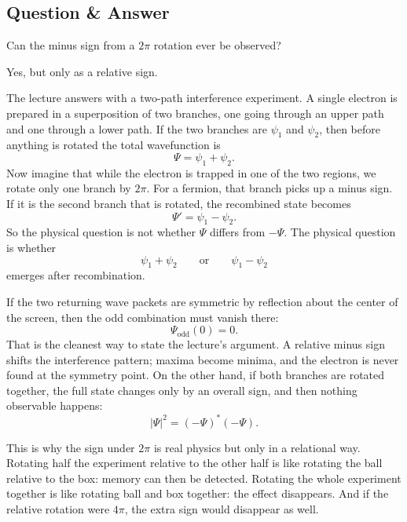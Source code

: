 \subsection{Question \& Answer}

Can the minus sign from a \(2\pi\) rotation ever be observed?

Yes, but only as a relative sign.

The lecture answers with a two-path interference experiment. A single electron is prepared in a superposition of two branches, one going through an upper path and one through a lower path. If the two branches are \(\psi_1\) and \(\psi_2\), then before anything is rotated the total wavefunction is
\begin{equation}
\Psi=\psi_1+\psi_2.
\end{equation}
Now imagine that while the electron is trapped in one of the two regions, we rotate only one branch by \(2\pi\). For a fermion, that branch picks up a minus sign. If it is the second branch that is rotated, the recombined state becomes
\begin{equation}
\Psi'=\psi_1-\psi_2.
\end{equation}
So the physical question is not whether \(\Psi\) differs from \(-\Psi\). The physical question is whether
\begin{equation}
\psi_1+\psi_2
\qquad \text{or} \qquad
\psi_1-\psi_2
\end{equation}
emerges after recombination.

If the two returning wave packets are symmetric by reflection about the center of the screen, then the odd combination must vanish there:
\begin{equation}
\Psi_{\mathrm{odd}}(0)=0.
\end{equation}
That is the cleanest way to state the lecture's argument. A relative minus sign shifts the interference pattern; maxima become minima, and the electron is never found at the symmetry point. On the other hand, if both branches are rotated together, the full state changes only by an overall sign, and then nothing observable happens:
\begin{equation}
|\Psi|^2 = (-\Psi)^*(-\Psi).
\end{equation}

This is why the sign under \(2\pi\) is real physics but only in a relational way. Rotating half the experiment relative to the other half is like rotating the ball relative to the box: memory can then be detected. Rotating the whole experiment together is like rotating ball and box together: the effect disappears. And if the relative rotation were \(4\pi\), the extra sign would disappear as well.

